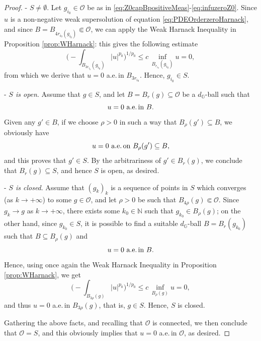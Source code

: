 \documentclass[11pt]{amsart}
\numberwithin{equation}{section} %
\theoremstyle{definition}
\begin{document}
\begin{proof}
 -\,\,\emph{$S\neq\emptyset$}. Let $g_{i_0}\in\mathcal{O}$ be as in \eqref{eq:Z0capBpositiveMeas}-\eqref{eq:infuzeroZ0}. Since $u$ is a non-negative weak supersolution of equation \eqref{eq:PDEOrderzeroHarnack}, and since
 $B = B_{4r_{i_0}(g_{i_0})}\Subset\mathcal{O}$, we can apply the Weak Harnack Inequality in Proposition \ref{prop:WHarnack}: this gives the following estimate
 $$\Big(-\!\!\!\!\!\!\!\int_{B_{3r_{i_0}}(g_{i_0})}|u|^{p_0}\Big)^{1/p_0}\leq c\,\inf_{B_{r_{i_0}}(g_{i_0})}u = 0,
$$
from which we derive that $u = 0$ a.e.\,in $B_{3r_{i_0}}$. Hence, $g_{i_0}\in S$.
 \medskip
 
 
 -\,\,\emph{$S$ is open}. Assume that $g\in S$, and let $B = B_r(g)\subseteq \mathcal{O}$ be a 
 $d_\mathbb{G}$-ball such that  
 $$\text{$u = 0$ a.e.\,in $B$}.$$ 
 Given any $g'\in B$, if we choose $\rho > 0$ in such a way that $B_\rho(g')\subseteq B$, we obviously have
  $$\text{$u = 0$ a.e.\,on $B_{\rho}(g')\subseteq B$},$$
 and this proves that $g'\in S$.
 By the arbitrariness of $g'\in B_r(g)$, we  conclude that $B_r(g)\subseteq S$, and hence $S$ is open, as desired.

 \medskip

-\,\,\emph{$S$ is closed}. Assume that $(g_k)_k$ is a sequence of points in $S$ which converges (as $k\to+\infty$) to some $g\in\mathcal{O}$, and let $\rho > 0$
be such that $B_{4\rho}(g)\Subset\mathcal{O}$. Since $g_k\to g$ as $k\to+\infty$, there
exists some $k_0\in\mathbb{N}$ such that $g_{k_0}\in B_\rho(g)$; on the other hand, since
$g_{k_0}\in S$, it is possible to find a suitable $d_\mathbb{G}$-ball $B = B_r(g_{k_0})$
such that $B \subseteq B_\rho(g)$ and
$$\text{$u = 0$ a.e.\,in $B$}.$$
Hence, using once again the 
Weak
 Harnack Inequality in Proposition \ref{prop:WHarnack}, we get
$$\Big(-\!\!\!\!\!\!\!\int_{B_{3\rho}(g)}|u|^{p_0}\Big)^{1/p_0}\leq c\,\inf_{B_{\rho}(g)}u = 0,
$$
and thus $u = 0$ a.e.\,in $B_{3\rho}(g)$, that is, $g\in S$. Hence, $S$ is closed.
\medskip

Gathering the above facts, and recalling that $\mathcal{O}$ is connected, we then conclude that $\mathcal{O} = S$, and this obviously implies that
$u = 0$ a.e.\,in $\mathcal{O}$, as desired.
\end{proof}
\end{document}
